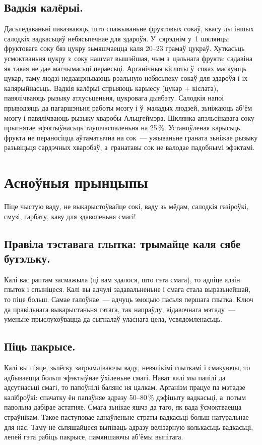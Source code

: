 \subsection{Вадкія калёрыі.}
Дасьледаваньні паказваюць, што спажываньне фруктовых сокаў, квасу ды іншых салодкіх вадкасьцяў небясьпечнае для здароўя. У~сярэднім у~1 шклянцы фруктовага соку бяз цукру зьмяшчаецца каля 20--23 грамаў цукраў. Хуткасьць усмоктваньня цукру з~соку нашмат вышэйшая, чым з~цэльнага фрукта: садавіна як такая не дае магчымасьці пераесьці. Арганічныя кіслоты ў~соках маскуюць цукар, таму людзі недаацэньваюць рэальную небясьпеку сокаў для здароўя і іх калярыйнасьць. Вадкія калёрыі спрыяюць карыесу (цукар + кіслата), павялічваюць рызыку атлусьценьня, цукровага дыябэту. Салодкія напоі прыводзяць да пагаршэньня работы мозгу і ў~маладых людзей, зьніжаюць аб'ём мозгу і павялічваюць рызыку хваробы Альцгеймэра. Шклянка апэльсінавага соку прыгнятае эфэктыўнасьць тлушчаспаленьня на 25\,\%. Устаноўленая карысьць фрукта не пераносіцца аўтаматычна на сок~--- ужываньне граната зьніжае рызыку разьвіцьця сардэчных хваробаў, а~гранатавы сок не валодае падобнымі эфэктамі.

\section{Асноўныя прынцыпы}

Піце чыстую ваду, не выкарыстоўвайце сокі, ваду зь мёдам, салодкія газіроўкі, смузі, гарбату, каву для здаволеньня смагі!

\subsection{Правіла тэставага глытка: трымайце каля сябе бутэльку.}
Калі вас раптам засмажыла (ці вам здалося, што гэта смага), то адпіце адзін глыток і спыніцеся. Калі вы адчулі задавальненьне і смага стала выразьнейшай, то піце больш. Самае галоўнае~--- адчуць эмоцыю пасьля першага глытка. Ключ да правільнага выкарыстаньня гэтага, так напраўду, відавочнага мэтаду~--- уменьне прыслухоўвацца да сыгналаў уласнага цела, усвядомленасьць.


\subsection{Піць пакрысе.}
Калі вы п'яце, зьлёгку затрымліваючы ваду, невялікімі глыткамі і смакуючы, то адбываецца больш эфэктыўнае ўхіленьне смагі. Нават калі мы папілі да адсутнасьці смагі, то папоўнілі балянс ня цалкам. Арганізм працуе па мэтадзе каліброўкі: спачатку ён папаўняе адразу 50--80\,\% дэфіцыту вадкасьці, а~потым павольна дабірае астатняе. Смага зьнікае яшчэ да таго, як вада ўсмоктваецца страўнікам. Такое паступовае аднаўленьне страты вадкасьці больш натуральнае для нас. Таму не сьпяшайцеся выпіваць адразу велізарную колькасьць вадкасьці, лепей гэта рабіць пакрысе, памяншаючы аб'ёмы выпітага.

